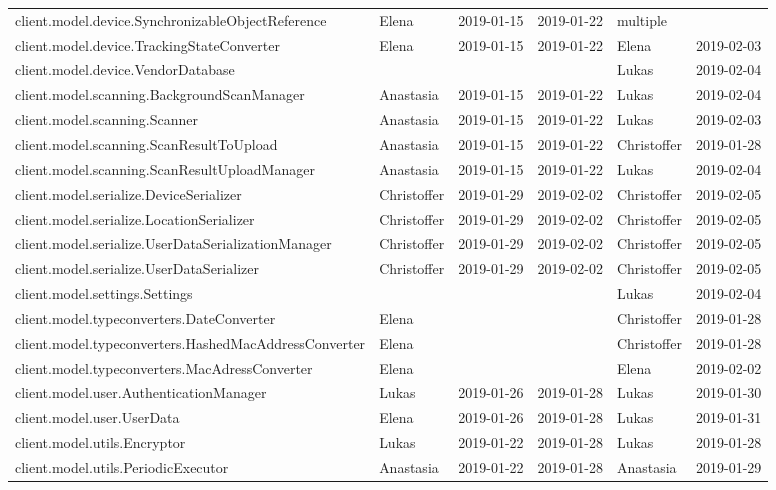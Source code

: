 \begin{adjustbox}{totalheight=\baselineskip}
\begin{tabular}{ l l r r l r }
client.model.device.SynchronizableObjectReference & Elena & 2019-01-15 & 2019-01-22 & multiple &  \\
client.model.device.TrackingStateConverter & Elena & 2019-01-15 & 2019-01-22 & Elena & 2019-02-03 \\
client.model.device.VendorDatabase &  &  &  & Lukas & 2019-02-04 \\
client.model.scanning.BackgroundScanManager & Anastasia & 2019-01-15 & 2019-01-22 & Lukas & 2019-02-04 \\
client.model.scanning.Scanner & Anastasia & 2019-01-15 & 2019-01-22 & Lukas & 2019-02-03 \\
client.model.scanning.ScanResultToUpload & Anastasia & 2019-01-15 & 2019-01-22 & Christoffer & 2019-01-28 \\
client.model.scanning.ScanResultUploadManager & Anastasia & 2019-01-15 & 2019-01-22 & Lukas & 2019-02-04 \\
client.model.serialize.DeviceSerializer & Christoffer & 2019-01-29 & 2019-02-02 & Christoffer & 2019-02-05 \\
client.model.serialize.LocationSerializer & Christoffer & 2019-01-29 & 2019-02-02 & Christoffer & 2019-02-05 \\
client.model.serialize.UserDataSerializationManager & Christoffer & 2019-01-29 & 2019-02-02 & Christoffer & 2019-02-05 \\
client.model.serialize.UserDataSerializer & Christoffer & 2019-01-29 & 2019-02-02 & Christoffer & 2019-02-05 \\
client.model.settings.Settings &  &  &  & Lukas & 2019-02-04 \\
client.model.typeconverters.DateConverter & Elena &  &  & Christoffer & 2019-01-28 \\
client.model.typeconverters.HashedMacAddressConverter & Elena &  &  & Christoffer & 2019-01-28 \\
client.model.typeconverters.MacAdressConverter & Elena &  &  & Elena & 2019-02-02 \\
client.model.user.AuthenticationManager & Lukas & 2019-01-26 & 2019-01-28 & Lukas & 2019-01-30 \\
client.model.user.UserData & Elena & 2019-01-26 & 2019-01-28 & Lukas & 2019-01-31 \\
client.model.utils.Encryptor & Lukas & 2019-01-22 & 2019-01-28 & Lukas & 2019-01-28 \\
client.model.utils.PeriodicExecutor & Anastasia & 2019-01-22 & 2019-01-28 & Anastasia & 2019-01-29 \\

\end{tabular}
\end{adjustbox}
